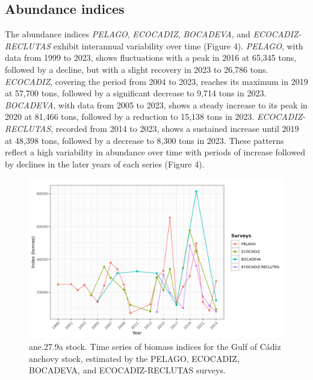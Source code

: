 \documentclass[
]{article}
\begin{document}
\hypertarget{abundance-indices}{%
\subsection{Abundance indices}\label{abundance-indices}}

The abundance indices \emph{PELAGO}, \emph{ECOCADIZ}, \emph{BOCADEVA},
and \emph{ECOCADIZ-RECLUTAS} exhibit interannual variability over time
(Figure 4). \emph{PELAGO}, with data from 1999 to 2023, shows
fluctuations with a peak in 2016 at 65,345 tons, followed by a decline,
but with a slight recovery in 2023 to 26,786 tons. \emph{ECOCADIZ},
covering the period from 2004 to 2023, reaches its maximum in 2019 at
57,700 tons, followed by a significant decrease to 9,714 tons in 2023.
\emph{BOCADEVA}, with data from 2005 to 2023, shows a steady increase to
its peak in 2020 at 81,466 tons, followed by a reduction to 15,138 tons
in 2023. \emph{ECOCADIZ-RECLUTAS}, recorded from 2014 to 2023, shows a
sustained increase until 2019 at 48,398 tons, followed by a decrease to
8,300 tons in 2023. These patterns reflect a high variability in
abundance over time with periods of increase followed by declines in the
later years of each series (Figure 4).

\begin{figure}[H]

{\centering \includegraphics[width=0.95\linewidth]{report/run/S1.0_4FLEETS//fig_indiceBiomass} 

}

\caption{ane.27.9a stock. Time series of biomass indices for the Gulf of Cádiz anchovy stock, estimated by the PELAGO, ECOCADIZ, BOCADEVA, and ECOCADIZ-RECLUTAS surveys.}\label{fig:unnamed-chunk-5}
\end{figure}
\end{document}
